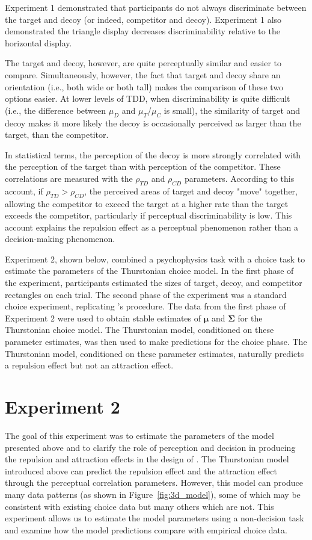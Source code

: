 Experiment 1 demonstrated that participants do not always discriminate between the target and decoy (or indeed, competitor and decoy). Experiment 1 also demonstrated the triangle display decreases discriminability relative to the horizontal display.

The target and decoy, however, are quite perceptually similar and easier to compare. Simultaneously, however, the fact that target and decoy share an orientation (i.e., both wide or both tall) makes the comparison of these two options easier. At lower levels of TDD, when discriminability is quite difficult (i.e., the difference between $\mu_{D}$ and $\mu_{T}$/$\mu_{C}$ is small), the similarity of target and decoy makes it more likely the decoy is occasionally perceived as larger than the target, than the competitor. 

In statistical terms, the perception of the decoy is more strongly correlated with the perception of the target than with perception of the competitor. These correlations are measured with the $\rho_{TD}$ and $\rho_{CD}$ parameters. According to this account, if $\rho_{TD}>\rho_{CD}$, the perceived areas of target and decoy "move" together, allowing the competitor to exceed the target at a higher rate than the target exceeds the competitor, particularly if perceptual discriminability is low. This account explains the repulsion effect as a perceptual phenomenon rather than a decision-making phenomenon.

Experiment 2, shown below, combined a psychophysics task with a choice task to estimate the parameters of the Thurstonian choice model. In the first phase of the experiment, participants estimated the sizes of target, decoy, and competitor rectangles on each trial. The second phase of the experiment was a standard choice experiment, replicating \textcite{spektorWhenGoodLooks2018b}'s procedure. The data from the first phase of Experiment 2 were used to obtain stable estimates of  $\boldsymbol{\mu}$ and $\boldsymbol{\Sigma}$ for the Thurstonian choice model. The Thurstonian model, conditioned on these parameter estimates, was then used to make predictions for the choice phase. The Thurstonian model, conditioned on these parameter estimates, naturally predicts a repulsion effect but not an attraction effect.  

\section{Experiment 2}
The goal of this experiment was to estimate the parameters of the model presented above and to clarify the role of perception and decision in producing the repulsion and attraction effects in the design of \textcite{spektorWhenGoodLooks2018b}. The Thurstonian model introduced above can predict the repulsion effect and the attraction effect through the perceptual correlation parameters. However, this model can produce many data patterns (as shown in Figure~\ref{fig:3d_model}), some of which may be consistent with existing choice data but many others which are not. This experiment allows us to estimate the model parameters using a non-decision task and examine how the model predictions compare with empirical choice data.

